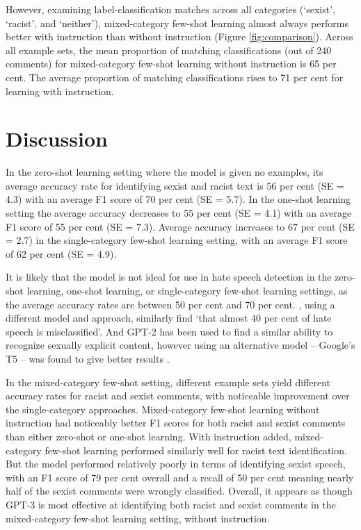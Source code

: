 \documentclass{bmcart}
\begin{document}
However, examining label-classification matches across all categories (`sexist', `racist', and `neither'), mixed-category few-shot learning almost always performs better with instruction than without instruction (Figure \ref{fig:comparison}). Across all example sets, the mean proportion of matching classifications (out of 240 comments) for mixed-category few-shot learning without instruction is 65 per cent. The average proportion of matching classifications rises to 71 per cent for learning with instruction.





\section{Discussion}\label{discussion}

In the zero-shot learning setting where the model is given no examples, its average accuracy rate for identifying sexist and racist text is 56 per cent (SE = 4.3) with an average F1 score of 70 per cent (SE = 5.7). In the one-shot learning setting the average accuracy decreases to 55 per cent (SE = 4.1) with an average F1 score of 55 per cent (SE = 7.3). Average accuracy increases to 67 per cent (SE = 2.7) in the single-category few-shot learning setting, with an average F1 score of 62 per cent (SE = 4.9).

It is likely that the model is not ideal for use in hate speech detection in the zero-shot learning, one-shot learning, or single-category few-shot learning settings, as the average accuracy rates are between 50 per cent and 70 per cent. \cite{davidson2017automated}, using a different model and approach, similarly find `that almost 40 per cent of hate speech is misclassified'. And GPT-2 has been used to find a similar ability to recognize sexually explicit content, however using an alternative model -- Google's T5 \cite{raffel2020exploring} -- was found to give better results \cite{schick2021selfdiagnosis}.

In the mixed-category few-shot setting, different example sets yield different accuracy rates for racist and sexist comments, with noticeable improvement over the single-category approaches. Mixed-category few-shot learning without instruction had noticeably better F1 scores for both racist and sexist comments than either zero-shot or one-shot learning. With instruction added, mixed-category few-shot learning performed similarly well for racist text identification. But the model performed relatively poorly in terms of identifying sexist speech, with an F1 score of 79 per cent overall and a recall of 50 per cent meaning nearly half of the sexist comments were wrongly classified. Overall, it appears as though GPT-3 is most effective at identifying both racist and sexist comments in the mixed-category few-shot learning setting, without instruction.
\end{document}
